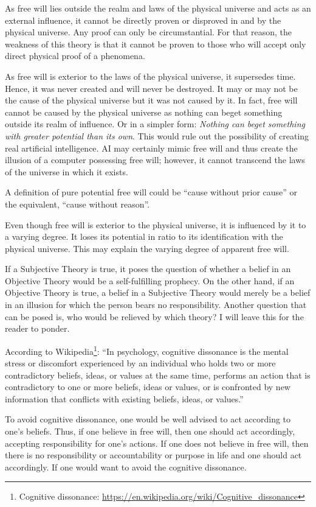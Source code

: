 \documentclass[11pt]{article}
\begin{document}
As free will lies outside the realm and laws of the physical universe and acts
as an external influence, it cannot be directly proven or disproved in and by
the physical universe. Any proof can only be circumstantial. For that reason,
the weakness of this theory is that it cannot be proven to those who will accept
only direct physical proof of a phenomena.

As free will is exterior to the laws of the physical universe, it supersedes
time. Hence, it was never created and will never be destroyed. It may or may not
be the cause of the physical universe but it was not caused by it. In fact, free
will cannot be caused by the physical universe as nothing can beget something
outside its realm of influence. Or in a simpler form: {\em Nothing can beget
something with greater potential than its own}. This would rule out the
possibility of creating real artificial intelligence. AI may certainly mimic
free will and thus create the illusion of a computer possessing free will;
however, it cannot transcend the laws of the universe in which it exists.

A definition of pure potential free will could be ``cause without prior cause''
or the equivalent, ``cause without reason''.

Even though free will is exterior to the physical universe, it is influenced by
it to a varying degree. It loses its potential in ratio to its identification
with the physical universe. This may explain the varying degree of apparent free
will.

If a Subjective Theory is true, it poses the question of whether a belief in
an Objective Theory would be a self-fulfilling prophecy. On the other hand, if
an Objective Theory is true, a belief in a Subjective Theory would merely be
a belief in an illusion for which the person bears no responsibility. Another
question that can be posed is, who would be relieved by which theory? I will
leave this for the reader to ponder.

According to Wikipedia\footnote{ Cognitive dissonance: \url{https://en.wikipedia.org/wiki/Cognitive_dissonance}}: 
``In psychology, cognitive dissonance is the mental stress
or discomfort experienced by an individual who holds two or more contradictory
beliefs, ideas, or values at the same time, performs an action that is
contradictory to one or more beliefs, ideas or values, or is confronted by new
information that conflicts with existing beliefs, ideas, or values.''

To avoid cognitive dissonance, one would be well advised to act according to
one's beliefs. Thus, if one believe in free will, then one should act
accordingly, accepting responsibility for one's actions. If one does not believe
in free will, then there is no responsibility or accountability or purpose in
life and one should act accordingly. If one would want to avoid the cognitive
dissonance.
\end{document}
